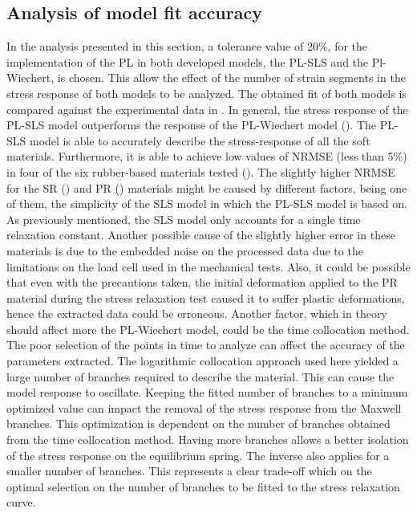 \newpage

\subsection{Analysis of model fit accuracy} \label{ModelfitAnalysis}

In the analysis presented in this section, a tolerance value of 20\%, for the implementation of the PL in both developed models, the  PL-SLS and the Pl-Wiechert, is chosen. This allow the effect of the number of strain segments in the stress response of both models to be analyzed. The obtained fit of both models is compared against the experimental data in . In general, the stress response of the PL-SLS model outperforms the response of the PL-Wiechert model (). The PL-SLS model is able to accurately describe the stress-response of all the soft materials. Furthermore, it is able to achieve low values of NRMSE (less than 5\%) in four of the six rubber-based materials tested (). The slightly higher NRMSE for the SR () and PR () materials might be caused by different factors, being one of them, the simplicity of the SLS model in which the PL-SLS model is based on. As previously mentioned, the SLS model only accounts for a single time relaxation constant. Another possible cause of the slightly higher error in these materials is due to the embedded noise on the processed data due to the limitations on the load cell used in the mechanical tests. Also, it could be possible that even with the precautions taken, the initial deformation applied to the PR material during the stress relaxation test caused it to suffer plastic deformations, hence the extracted data could be erroneous. Another factor, which in theory should affect more the PL-Wiechert model, could be the time collocation method. The poor selection of the points in time to analyze can affect the accuracy of the parameters extracted. The logarithmic collocation approach used here yielded a large number of branches required to describe the material. This can cause the model response to oscillate. Keeping the fitted number of branches to a minimum optimized value can impact the removal of the stress response from the Maxwell branches. This optimization is dependent on the number of branches obtained from the time collocation method. Having more branches allows a better isolation of the stress response on the equilibrium spring. The inverse also applies for a smaller number of branches. This represents a clear trade-off which on the optimal selection on the number of branches to be fitted to the stress relaxation curve.

